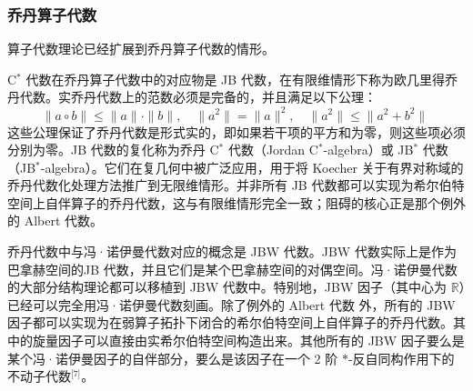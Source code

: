 \subsubsection{乔丹算子代数}
算子代数理论已经扩展到乔丹算子代数的情形。

C$^*$ 代数在乔丹算子代数中的对应物是 JB 代数，在有限维情形下称为欧几里得乔丹代数。实乔丹代数上的范数必须是完备的，并且满足以下公理：
$$
\|a \circ b\| \leq \|a\| \cdot \|b\|,\quad \|a^2\| = \|a\|^2,\quad \|a^2\| \leq \|a^2 + b^2\|~
$$
这些公理保证了乔丹代数是形式实的，即如果若干项的平方和为零，则这些项必须分别为零。JB 代数的复化称为乔丹 C$^*$ 代数（Jordan C$^*$-algebra）或 JB$^*$ 代数（JB$^*$-algebra）。它们在复几何中被广泛应用，用于将 Koecher 关于有界对称域的乔丹代数化处理方法推广到无限维情形。并非所有 JB 代数都可以实现为希尔伯特空间上自伴算子的乔丹代数，这与有限维情形完全一致；阻碍的核心正是那个例外的 Albert 代数。

乔丹代数中与冯·诺伊曼代数对应的概念是 JBW 代数。JBW 代数实际上是作为巴拿赫空间的JB 代数，并且它们是某个巴拿赫空间的对偶空间。冯·诺伊曼代数的大部分结构理论都可以移植到 JBW 代数中。特别地，JBW 因子（其中心为 $\mathbb{R}$）已经可以完全用冯·诺伊曼代数刻画。除了例外的 Albert 代数 外，所有的 JBW 因子都可以实现为在弱算子拓扑下闭合的希尔伯特空间上自伴算子的乔丹代数。其中的旋量因子可以直接由实希尔伯特空间构造出来。其他所有的 JBW 因子要么是某个冯·诺伊曼因子的自伴部分，要么是该因子在一个 2 阶 $*$-反自同构作用下的不动子代数\(^\text{[7]}\)。
